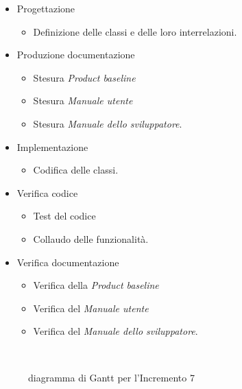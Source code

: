\documentclass[../piano-di-progetto.tex]{subfiles}
\begin{document}
\begin{itemize}
  \item Progettazione
  \begin{itemize}
    \item Definizione delle classi e delle loro interrelazioni.
  \end{itemize}
  \item Produzione documentazione
  \begin{itemize}
    \item Stesura \textit{Product baseline}
    \item Stesura \textit{Manuale utente}
    \item Stesura \textit{Manuale dello sviluppatore}.
  \end{itemize}
  \item Implementazione
  \begin{itemize}
    \item Codifica delle classi.
  \end{itemize}
  \item Verifica codice
  \begin{itemize}
    \item Test del codice
    \item Collaudo delle funzionalità.
  \end{itemize}
  \item Verifica documentazione
  \begin{itemize}
    \item Verifica della \textit{Product baseline}
    \item Verifica del \textit{Manuale utente}
    \item Verifica del \textit{Manuale dello sviluppatore}.
  \end{itemize}
\end{itemize}
\begin{figure}[H]
  \centering
  
  \caption{diagramma di Gantt per l'Incremento 7}%
~~\label{fig:gantt_incremento_7}
\end{figure}
\end{document}
